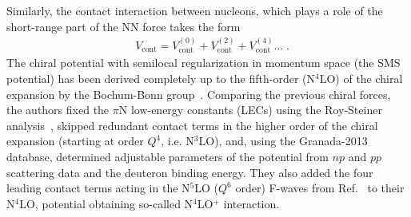 Similarly, the contact interaction between nucleons, which plays a role of the short-range part of the NN force takes the form
\begin{equation}
\begin{split}
&V_{\mathrm{cont}} = V^{(0)}_{\mathrm{cont}} + V^{(2)}_{\mathrm{cont}} + V^{(4)}_{\mathrm{cont}} \ldots\;.
\end{split}
\label{eg:ch3}
\end{equation}
The chiral potential with semilocal regularization in momentum space (the SMS potential) has been derived completely up to the fifth-order (N$^{4}$LO) of the chiral expansion by the Bochum-Bonn group~\cite{Reinert2018}. Comparing the previous chiral forces, the authors fixed the $\pi$N low-energy constants (LECs) using the Roy-Steiner analysis~\cite{hoferichter2015matching}, skipped redundant contact terms in the higher order of the chiral expansion (starting at order $Q^{4}$, i.e. N$^{3}$LO), and, using the Granada-2013 database, determined adjustable parameters of the potential from $np$ and $pp$ scattering data and the deuteron binding energy. They also added the four leading contact terms acting in the N$^{5}$LO ($Q^{6}$ order) F-waves from Ref.~\cite{Entem2017} to their N$^{4}$LO, potential obtaining so-called N$^{4}$LO$^{+}$ interaction.

